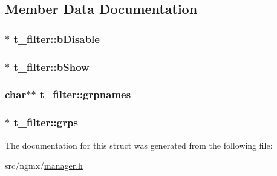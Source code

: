 \subsection{\-Member \-Data \-Documentation}
\hypertarget{structt__filter_a59cfe6ac0779100fccb7a29e25979084}{
\subsubsection[{b\-Disable}]{$\ast$ {\bf t\-\_\-filter\-::b\-Disable}}}\label{structt__filter_a59cfe6ac0779100fccb7a29e25979084}
\hypertarget{structt__filter_afc604a944609edcfd4cc6bcfca7cdabd}{
\subsubsection[{b\-Show}]{$\ast$ {\bf t\-\_\-filter\-::b\-Show}}}\label{structt__filter_afc604a944609edcfd4cc6bcfca7cdabd}
\hypertarget{structt__filter_a416c3f8c8bd00d04e2cca52e34e57020}{
\subsubsection[{grpnames}]{\setlength{\rightskip}{0pt plus 5cm}char$\ast$$\ast$ {\bf t\-\_\-filter\-::grpnames}}}\label{structt__filter_a416c3f8c8bd00d04e2cca52e34e57020}
\hypertarget{structt__filter_a5e4a0c9e49271af48cdc1f550e553dd6}{
\subsubsection[{grps}]{$\ast$ {\bf t\-\_\-filter\-::grps}}}\label{structt__filter_a5e4a0c9e49271af48cdc1f550e553dd6}


\-The documentation for this struct was generated from the following file\-:\begin{DoxyCompactItemize}
\item 
src/ngmx/\hyperlink{manager_8h}{manager.\-h}\end{DoxyCompactItemize}
